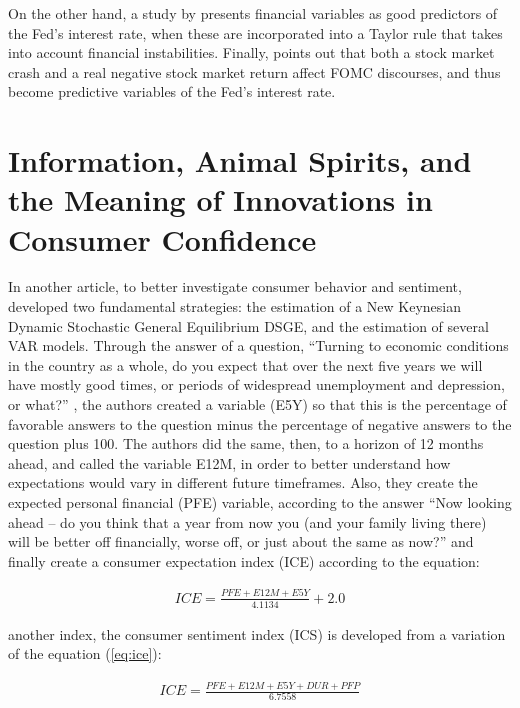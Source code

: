 On the other hand, a study by \cite{peek2015should} presents financial variables as good predictors of the Fed's interest rate, when these are incorporated into a Taylor rule that takes into account financial instabilities. Finally, \cite{cieslak2021economics} points out that both a stock market crash and a real negative stock market return affect FOMC discourses, and thus become predictive variables of the Fed's interest rate.\\

\section{Information, Animal Spirits, and the Meaning of Innovations in Consumer Confidence}

In another article, to better investigate consumer behavior and sentiment, \cite{barsky2012information} developed two fundamental strategies: the estimation of a New Keynesian Dynamic Stochastic General Equilibrium DSGE, and the estimation of several VAR models. Through the answer of a question, ``Turning to economic conditions in the country as a whole, do you expect that over the next five years we will have mostly good times, or periods of widespread unemployment and depression, or what?'' \cite[p.1347]{barsky2012information}, the authors created a variable (E5Y) so that this is the percentage of favorable answers to the question minus the percentage of negative answers to the question plus 100. The authors did the same, then, to a horizon of 12 months ahead, and called the variable E12M, in order to better understand how expectations would vary in different future timeframes. Also, they create the expected personal financial (PFE) variable, according to the answer ``Now looking ahead -- do you think that a year from now you (and your family living there) will be better off financially, worse off, or just about the same as now?'' \cite[p.1371]{barsky2012information} and finally create a consumer expectation index (ICE) according to the equation:

\begin{align} \label{eq:ice}
    ICE = \frac{PFE + E12M + E5Y}{4.1134} + 2.0
\end{align}

another index, the consumer sentiment index (ICS) is developed from a variation of the equation (\ref{eq:ice}):

\begin{align} \label{eq:ics}
    ICE = \frac{PFE + E12M + E5Y + DUR + PFP}{6.7558}
\end{align}

